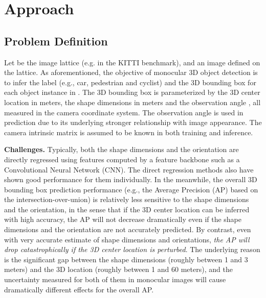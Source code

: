 \documentclass[letterpaper]{article} \usepackage{aaai22}  \usepackage{times}  \usepackage{helvet}  \usepackage{courier}  \usepackage[hyphens]{url}  \usepackage{graphicx} \urlstyle{rm} \def\UrlFont{\rm}  \usepackage{natbib}  \usepackage{caption} \DeclareCaptionStyle{ruled}{labelfont=normalfont,labelsep=colon,strut=off} \frenchspacing  \setlength{\pdfpagewidth}{8.5in}  \setlength{\pdfpageheight}{11in}  \usepackage{algorithm}
\begin{document}
\section{Approach}

\subsection{Problem Definition}

Let  be the image lattice (e.g.  in the KITTI benchmark), and  an image defined on the lattice. As aforementioned, the objective of monocular 3D object detection is to infer the label (e.g., car, pedestrian and cyclist) and the 3D bounding box for each object instance in . The 3D bounding box is parameterized by the 3D center location  in meters, the shape dimensions  in meters and the observation angle , all measured in the camera coordinate system. 
The observation angle is used in prediction due to its underlying stronger relationship with image appearance. The camera intrinsic matrix is assumed to be known in both training and inference. 

\textbf{Challenges.} Typically, both the shape dimensions and the orientation are directly regressed using features computed by a feature backbone such as a Convolutional Neural Network (CNN). The direct regression methods also have shown good performance for them individually. In the meanwhile, the overall 3D bounding box prediction performance (e.g., the Average Precision (AP) based on the intersection-over-union) is relatively less sensitive to the shape dimensions and the orientation, in the sense that if the 3D center location can be inferred with high accuracy, the AP will not decrease dramatically even if the shape dimensions and the orientation are not  accurately predicted. By contrast, even with very accurate estimate of shape dimensions and orientations, \textit{the AP will drop catastrophically if the 3D center location is perturbed}. The underlying reason is the significant gap between the shape dimensions (roughly between 1 and 3 meters) and the 3D location (roughly between 1 and 60 meters), and the uncertainty measured for both of them in monocular images will cause dramatically different effects for the overall AP.
\end{document}
